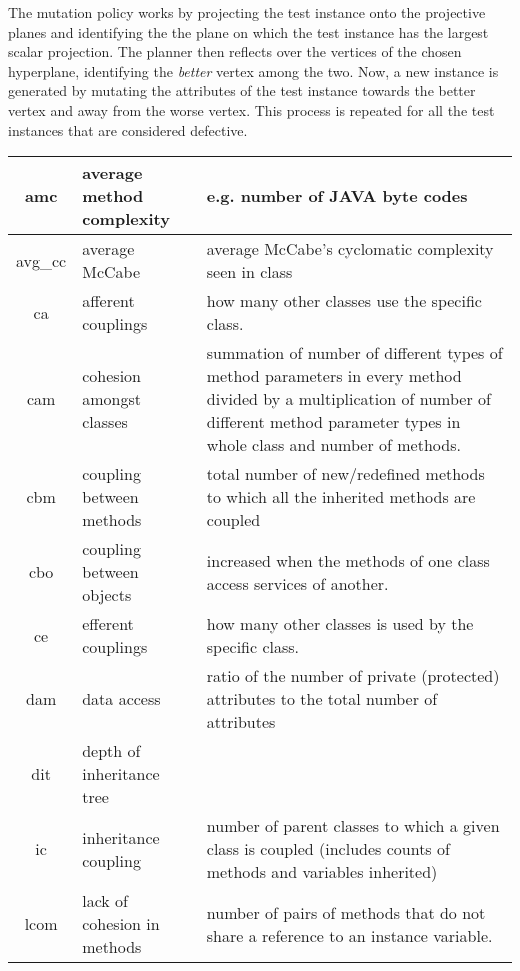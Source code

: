 \documentclass[conference]{IEEEtran}
\begin{document}
The mutation policy works by projecting the test instance onto the projective planes and identifying the the plane on which the test instance has the largest scalar projection. The planner then reflects over the vertices of the chosen hyperplane, identifying the \textit{better} vertex among the two. Now, a new instance is generated by mutating the attributes of the test instance towards the better vertex and away from the worse vertex. This process is repeated for all the test instances that are considered defective.
\begin{figure*}[htbp!]
  \renewcommand{\baselinestretch}{0.8}\begin{center}
    {\scriptsize
      \begin{tabular}{c|l|p{4.7in}}
        amc & average method complexity & e.g. number of JAVA byte codes\\\hline
        avg\_cc & average McCabe & average McCabe's cyclomatic complexity seen
        in class\\\hline
        ca & afferent couplings & how many other classes use the specific
        class. \\\hline
        cam & cohesion amongst classes & summation of number of different
        types of method parameters in every method divided by a multiplication
        of number of different method parameter types in whole class and
        number of methods. \\\hline
        cbm &coupling between methods &  total number of new/redefined methods
        to which all the inherited methods are coupled\\\hline
        cbo & coupling between objects & increased when the methods of one
        class access services of another.\\\hline
        ce & efferent couplings & how many other classes is used by the
        specific class. \\\hline
        dam & data access & ratio of the number of private (protected)
        attributes to the total number of attributes\\\hline
        dit & depth of inheritance tree &\\\hline
        ic & inheritance coupling &  number of parent classes to which a given
        class is coupled (includes counts of methods and variables inherited)
        \\\hline
        lcom & lack of cohesion in methods &number of pairs of methods that do
        not share a reference to an instance variable.\\\hline

\end{tabular}}
\end{center}
\end{figure*}
\end{document}
